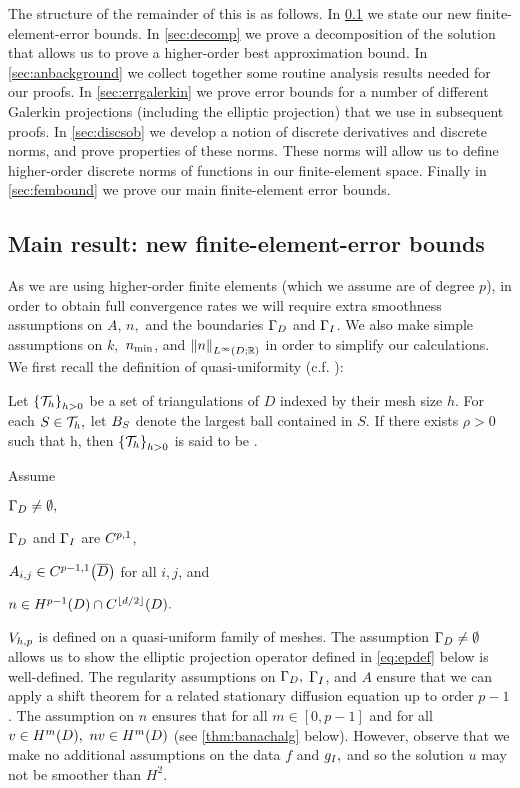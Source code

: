 The structure of the remainder of this  is as follows. In \cref{sec:errbounds} we state our new finite-element-error bounds. In \cref{sec:decomp} we prove a decomposition of the solution that allows us to prove a higher-order best approximation bound. In \cref{sec:anbackground} we collect together some routine analysis results needed for our proofs. In \cref{sec:errgalerkin} we prove error bounds for a number of different Galerkin projections (including the elliptic projection) that we use in subsequent proofs. In \cref{sec:discsob} we develop a notion of discrete derivatives and discrete norms, and prove properties of these norms. These norms will allow us to define higher-order discrete norms of functions in our finite-element space. Finally in \cref{sec:fembound} we prove our main finite-element error bounds.



\subsection{Main result: new finite-element-error bounds}\label{sec:errbounds}
As we are using higher-order finite elements (which we assume are of degree $p$), in order to obtain full convergence rates we will require extra smoothness assumptions on $A$, $n,$ and the boundaries $\Gamma_{D}$ and $\Gamma_{I}$. We also make simple assumptions on $k,$ $n_{\min}$, and $\NLiDRR{n}$ in order to simplify our calculations. We first recall the definition of quasi-uniformity (c.f. \cite[Definition 4.4.13]{BrSc:08}):

\label{def:quasiuniform}
Let $\set{\cTh}_{h>0}$ be a set of triangulations of $D$ indexed by their mesh size $h.$ For each $S \in \mathcal T_{h},$ let $B_{S}$ denote the largest ball contained in $S$.
If there exists $\rho > 0$ such that 
\beqs
\min{} \geq \rho h,
\eeqs
then $\set{\cTh}_{h>0}$ is said to be .
\ede

\label{ass:highp}
Assume
\bit
\item $\Gamma_{D} \neq \emptyset,$
\item $\Gamma_{D}$ and $\Gamma_{I}$ are $C^{p,1}$,
\item $\Aij \in \CpmooDclos$ for all $i,j$, and
\item $n \in \HpmoD \cap \CfloordtD.$
  \item $V_{h,p}$ is defined on a quasi-uniform family of meshes.
  \eit
  \eas
  The assumption $\Gamma_{D} \neq \emptyset$ allows us to show the elliptic projection operator defined in \cref{eq:epdef} below is well-defined. The regularity assumptions on $\Gamma_{D},$ $\Gamma_{I}$, and $A$ ensure that we can apply a shift theorem for a related stationary diffusion equation up to order $p-1$. The assumption on $n$ ensures that for all $m \in [0,p-1]$ and for all $v \in \HmD,$ $nv \in \HmD$ (see \cref{thm:banachalg} below). However, observe that we make no additional assumptions on the data $f$ and $g_{I},$ and so the solution $u$ may not be smoother than $H^2.$

